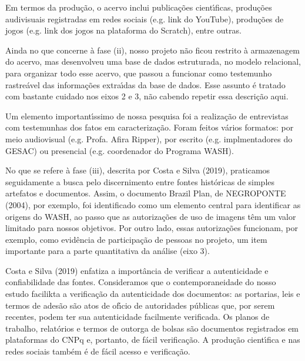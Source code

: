 \documentclass[
12pt,		%
openright,	%
twoside,  %
a4paper,			%
chapter=TITLE,		%
english,			%
french,				%
spanish,			%
brazil				%
]{USPSC-classe/USPSC}
\begin{document}
Em termos da produ\c{c}\~ao, o acervo inclui publica\c{c}\~oes cient\'{\i}ficas, produ\c{c}\~oes audivisuais registradas em redes sociais (e.g. link do YouTube), produ\c{c}\~oes de jogos (e.g. link dos jogos na plataforma do Scratch), entre outras.









Ainda no que concerne \`a fase (ii), nosso projeto n\~ao ficou restrito \`a armazenagem do acervo, mas desenvolveu uma base de dados estruturada, no modelo relacional, para organizar todo esse acervo, que passou a funcionar como testemunho rastre\'avel das informa\c{c}\~oes extra\'{\i}das da base de dados. Esse assunto \'e tratado com bastante cuidado nos eixos 2 e 3, n\~ao cabendo repetir essa descri\c{c}\~ao aqui.









Um elemento important\'{\i}ssimo de nossa pesquisa foi a realiza\c{c}\~ao de entrevistas com testemunhas dos fatos em caracteriza\c{c}\~ao. Foram feitos v\'arios formatos: por meio audiovisual (e.g. Profa. Afira Ripper), por escrito (e.g. implmentadores do GESAC) ou presencial (e.g. coordenador do Programa WASH).









No que se refere \`a fase (iii), descrita por  Costa e Silva (2019), praticamos seguidamente a busca pelo discernimento entre fontes hist\'oricas de simples artefatos e documentos. Assim, o documento \textquotedbl Brazil Plan\textquotedbl , de  NEGROPONTE (2004), por exemplo, foi identificado como um elemento central para identificar as origens do WASH, ao passo que as autoriza\c{c}\~oes de uso de imagens t\^em um valor limitado para nossos objetivos.  Por outro lado, essas autoriza\c{c}\~oes funcionam, por exemplo, como evid\^encia de participa\c{c}\~ao de pessoas no projeto, um item importante para a parte quantitativa da an\'alise (eixo 3).









Costa e Silva (2019) enfatiza a import\^ancia de verificar a autenticidade e confiabilidade das fontes. Consideramos que o contemporaneidade do nosso estudo facilikta a verifica\c{c}\~ao da autenticidade dos documentos: as portarias, leis e termos de ades\~ao s\~ao atos de of\'{\i}cio de autoridades p\'ublicas que, por serem recentes, podem ter sua autenticidade facilmente verificada. Os planos de trabalho, relat\'orios e termos de outorga de bolsas s\~ao documentos registrados em plataformas do CNPq e, portanto, de f\'acil verifica\c{c}\~ao. A produ\c{c}\~ao cient\'{\i}fica e nas redes sociais tamb\'em \'e de f\'acil acesso e verifica\c{c}\~ao.
\end{document}
